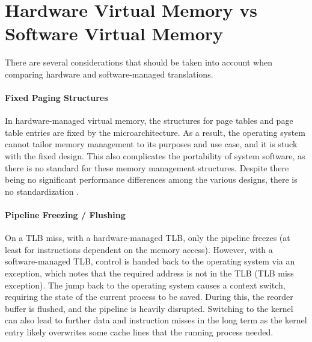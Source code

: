 







\section{Hardware Virtual Memory vs Software Virtual Memory}

There are several considerations that should be taken into account when comparing hardware and
software-managed translations.

\paragraph{Fixed Paging Structures} In hardware-managed virtual memory, the structures for page tables
and page table entries are fixed by the microarchitecture. As a result, the operating system cannot tailor
memory management to its purposes and use case, and it is stuck with the fixed design.
This also complicates the portability of system software, as there is no standard for these memory management
structures. Despite there being no significant performance differences among the various designs,
there is no standardization \cite{jacob1998look}.

\paragraph{Pipeline Freezing / Flushing} On a TLB miss,
with a hardware-managed TLB, only the pipeline freezes (at least for instructions dependent on
the memory access). However, with a software-managed TLB, control is handed back to the operating system
via an exception, which notes that the required address is not in the TLB (TLB miss exception).
The jump back to the operating system causes a context switch, requiring the state of the current process
to be saved. During this, the reorder buffer is flushed, and the pipeline is heavily disrupted.
Switching to the kernel can also lead to further data and instruction misses in the long term
as the kernel entry likely overwrites some cache lines that the running process needed. 

